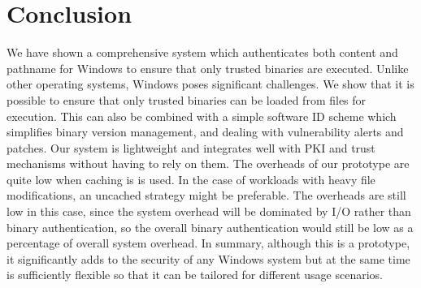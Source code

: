 \section{Conclusion}
\label{sect:conclusion}

We have shown a comprehensive system which authenticates both content and pathname
for Windows to ensure that only trusted binaries are executed. 
Unlike other operating systems, Windows poses significant challenges.
We show that it is possible to ensure that only trusted binaries can be loaded
from files for execution. 
This can also be combined with a simple software ID
scheme which simplifies binary version management, and dealing
with vulnerability alerts and patches.
Our system is lightweight and integrates well with PKI and 
trust mechanisms without
having to rely on them.
The overheads of our prototype are quite low when caching is is used.
In the case of workloads with heavy file modifications, an uncached strategy might be preferable.
The overheads are still low in this case, since the system overhead
will be dominated by I/O rather than binary authentication, so the overall binary authentication
would still be low as a percentage of overall system overhead. 
In summary, although this is a prototype, it significantly adds
to the security of any Windows system but at the same time is sufficiently
flexible so that it can be tailored for different usage scenarios.

